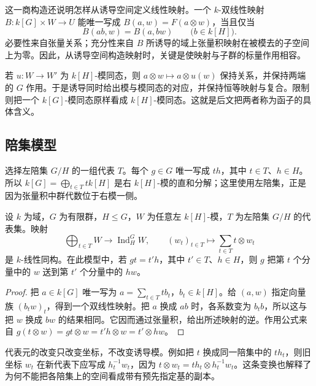 \ProseParagraphBreak
这一商构造还说明怎样从诱导空间定义线性映射。一个 \(k\)-双线性映射 \(B:k[G]\times W\rightarrow U\) 能唯一写成 \(B(a,w)=F(a\otimes w)\)，当且仅当
\[
	B(ab,w)=B(a,bw)\qquad\bigl(b\in k[H]\bigr).
\]
必要性来自张量关系；充分性来自 \(B\) 所诱导的域上张量积映射在被模去的子空间上为零。因此，从诱导空间构造映射时，关键是使映射与子群的标量作用相容。

\ProseParagraphBreak
若 \(u:W\rightarrow W'\) 为 \(k[H]\)-模同态，则 \(a\otimes w\mapsto a\otimes u(w)\) 保持关系，并保持两端的 \(G\) 作用。于是诱导同时给出模与模同态的对应，并保持恒等映射与复合。限制则把一个 \(k[G]\)-模同态原样看成 \(k[H]\)-模同态。这就是后文把两者称为函子的具体含义。

\subsection{陪集模型}
\label{b5:subsec:0301:02}

选择左陪集 \(G/H\) 的一组代表 \(T\)。每个 \(g\in G\) 唯一写成 \(th\)，其中 \(t\in T\)、\(h\in H\)。所以 \(k[G]=\bigoplus_{t\in T}t k[H]\) 是右 \(k[H]\)-模的直和分解；这里使用左陪集，正是因为张量积中群代数位于右模一侧。

\begin{proposition}\label{b5:prop:induced-coset-model}
	设 \(k\) 为域，\(G\) 为有限群，\(H\le G\)，\(W\) 为任意左 \(k[H]\)-模，\(T\) 为左陪集 \(G/H\) 的代表集。映射
	\[
		\bigoplus_{t\in T}W\longrightarrow\operatorname{Ind}_H^G W, \qquad(w_t)_{t\in T}\longmapsto\sum_{t\in T}t\otimes w_t
	\]
	是 \(k\)-线性同构。在此模型中，若 \(gt=t'h\)，其中 \(t'\in T\)、\(h\in H\)，则 \(g\) 把第 \(t\) 个分量中的 \(w\) 送到第 \(t'\) 个分量中的 \(hw\)。
\end{proposition}
\begin{proof}
	把 \(a\in k[G]\) 唯一写为 \(a=\sum_{t\in T}t b_t\)，\(b_t\in k[H]\)。给 \((a,w)\) 指定向量族 \((b_tw)_t\)，得到一个双线性映射。把 \(a\) 换成 \(ab\) 时，各系数变为 \(b_tb\)，所以这与把 \(w\) 换成 \(bw\) 的结果相同。它因而通过张量积，给出所述映射的逆。作用公式来自 \(g(t\otimes w)=gt\otimes w=t'h\otimes w=t'\otimes hw\)。
\end{proof}

代表元的改变只改变坐标，不改变诱导模。例如把 \(t\) 换成同一陪集中的 \(th_t\)，则旧坐标 \(w_t\) 在新代表下应写成 \(h_t^{-1}w_t\)，因为 \(t\otimes w_t=th_t\otimes h_t^{-1}w_t\)。这条变换也解释了为何不能把各陪集上的空间看成带有预先指定基的副本。

